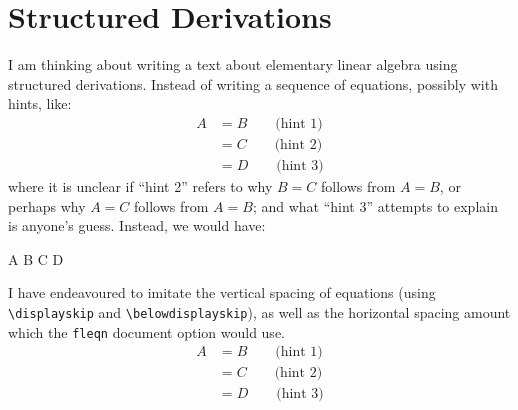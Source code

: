 \section{Structured Derivations}
\M I am thinking about writing a text about elementary linear algebra
using structured derivations. Instead of writing a sequence of
equations, possibly with hints, like:
\begin{subequations}
\begin{align}
  A &= B \qquad\mbox{(hint 1)}\\
  &= C \qquad\mbox{(hint 2)}\\
  &= D \qquad\mbox{(hint 3)}
\end{align}
\end{subequations}
where it is unclear if ``hint 2'' refers to why $B=C$ follows from
$A=B$, or perhaps why $A=C$ follows from $A=B$; and what ``hint 3''
attempts to explain is anyone's guess. Instead, we would have:
\begin{calculation}
  A
  B
  C
  D
\end{calculation}
I have endeavoured to imitate the vertical spacing of equations (using
\verb#\displayskip# and \verb#\belowdisplayskip#), as well as the
horizontal spacing amount which the \verb#fleqn# document option would
use.
\begin{align*}
  A &= B \qquad\mbox{(hint 1)}\\
  &= C \qquad\mbox{(hint 2)} \\
  &= D \qquad\mbox{(hint 3)}
\end{align*}

